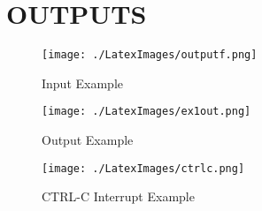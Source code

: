 \documentclass{article}
\begin{document}
\section{OUTPUTS}

\begin{figure}[htp]
    \centering
    \texttt{[image: ./LatexImages/outputf.png]}
    \caption{Input Example}
    \label{fig:galaxy}
\end{figure}
\begin{figure}[htp]
    \centering
    \texttt{[image: ./LatexImages/ex1out.png]}
    \caption{Output Example}
    \label{fig:galaxy}
\end{figure}
\begin{figure}[htp]
    \centering
    \texttt{[image: ./LatexImages/ctrlc.png]}
    \caption{CTRL-C Interrupt Example}
    \label{fig:galaxy}
\end{figure}
\end{document}
